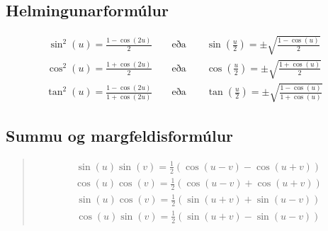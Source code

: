 \documentclass[a4paper,10pt,icelandic]{sphinxmanual}
\begin{document}
\subsection{Helmingunarformúlur}
\label{\detokenize{Kafli07:helmingunarformulur}}
\begin{equation*}
\begin{split}\sin^2(u) = \frac{1- \cos(2u)}{2} \qquad \text{eða} \qquad \sin\left(\frac{u}{2}\right) = \pm \sqrt{\frac{1- \cos(u)}{2} }\end{split}
\end{equation*}
\begin{equation*}
\begin{split}\cos^2(u) = \frac{1+ \cos(2u)}{2} \qquad \text{eða} \qquad \cos\left(\frac{u}{2}\right) = \pm \sqrt{\frac{1+ \cos(u)}{2} }\end{split}
\end{equation*}
\begin{equation*}
\begin{split}\tan^2(u) = \frac{1- \cos(2u)}{1+\cos(2u)} \qquad \text{eða} \qquad \tan\left(\frac{u}{2}\right) = \pm \sqrt{\frac{1- \cos(u)}{1+\cos(u)} }\end{split}
\end{equation*}

\subsection{Summu\sphinxhyphen{} og margfeldisformúlur}
\label{\detokenize{Kafli07:summu-og-margfeldisformulur}}
\begin{quote}

\begin{equation*}
\begin{split}\sin(u)\sin(v) = \frac{1}{2}\left(\cos(u-v) - \cos(u+v)\right)\end{split}
\end{equation*}
\begin{equation*}
\begin{split}\cos(u)\cos(v) = \frac{1}{2}\left(\cos(u-v) + \cos(u+v)\right)\end{split}
\end{equation*}
\begin{equation*}
\begin{split}\sin(u)\cos(v) = \frac{1}{2}\left(\sin(u+v) + \sin(u-v)\right)\end{split}
\end{equation*}
\begin{equation*}
\begin{split}\cos(u)\sin(v) = \frac{1}{2}\left(\sin(u+v) - \sin(u-v)\right)\end{split}
\end{equation*}\end{quote}
\end{document}
